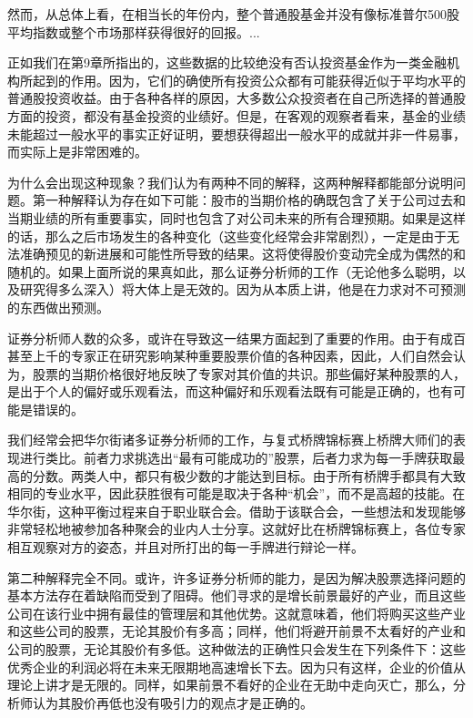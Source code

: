 \documentclass[12pt,oneside]{book}
\begin{document}
然而，从总体上看，在相当长的年份内，整个普通股基金并没有像标准普尔500股平均指数或整个市场那样获得很好的回报。...


正如我们在第9章所指出的，这些数据的比较绝没有否认投资基金作为一类金融机构所起到的作用。因为，它们的确使所有投资公众都有可能获得近似于平均水平的普通股投资收益。由于各种各样的原因，大多数公众投资者在自己所选择的普通股方面的投资，都没有基金投资的业绩好。但是，在客观的观察者看来，基金的业绩未能超过一般水平的事实正好证明，要想获得超出一般水平的成就并非一件易事，而实际上是非常困难的。

为什么会出现这种现象？我们认为有两种不同的解释，这两种解释都能部分说明问题。第一种解释认为存在如下可能：股市的当期价格的确既包含了关于公司过去和当期业绩的所有重要事实，同时也包含了对公司未来的所有合理预期。如果是这样的话，那么之后市场发生的各种变化（这些变化经常会非常剧烈），一定是由于无法准确预见的新进展和可能性所导致的结果。这将使得股价变动完全成为偶然的和随机的。如果上面所说的果真如此，那么证券分析师的工作（无论他多么聪明，以及研究得多么深入）将大体上是无效的。因为从本质上讲，他是在力求对不可预测的东西做出预测。

证券分析师人数的众多，或许在导致这一结果方面起到了重要的作用。由于有成百甚至上千的专家正在研究影响某种重要股票价值的各种因素，因此，人们自然会认为，股票的当期价格很好地反映了专家对其价值的共识。那些偏好某种股票的人，是出于个人的偏好或乐观看法，而这种偏好和乐观看法既有可能是正确的，也有可能是错误的。

我们经常会把华尔街诸多证券分析师的工作，与复式桥牌锦标赛上桥牌大师们的表现进行类比。前者力求挑选出“最有可能成功的”股票，后者力求为每一手牌获取最高的分数。两类人中，都只有极少数的才能达到目标。由于所有桥牌手都具有大致相同的专业水平，因此获胜很有可能是取决于各种“机会”，而不是高超的技能。在华尔街，这种平衡过程来自于职业联合会。借助于该联合会，一些想法和发现能够非常轻松地被参加各种聚会的业内人士分享。这就好比在桥牌锦标赛上，各位专家相互观察对方的姿态，并且对所打出的每一手牌进行辩论一样。

第二种解释完全不同。或许，许多证券分析师的能力，是因为解决股票选择问题的基本方法存在着缺陷而受到了阻碍。他们寻求的是增长前景最好的产业，而且这些公司在该行业中拥有最佳的管理层和其他优势。这就意味着，他们将购买这些产业和这些公司的股票，无论其股价有多高；同样，他们将避开前景不太看好的产业和公司的股票，无论其股价有多低。这种做法的正确性只会发生在下列条件下：这些优秀企业的利润必将在未来无限期地高速增长下去。因为只有这样，企业的价值从理论上讲才是无限的。同样，如果前景不看好的企业在无助中走向灭亡，那么，分析师认为其股价再低也没有吸引力的观点才是正确的。
\end{document}
